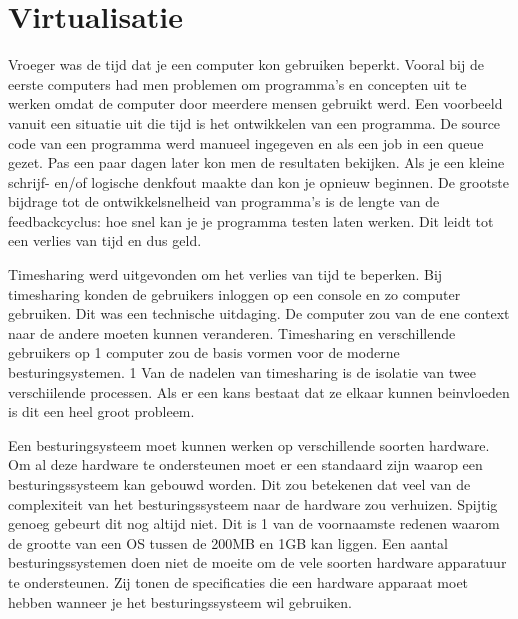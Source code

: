 \documentclass[pdftex,a4paper,12pt,twoside]{report}
\begin{document}

\chapter{Virtualisatie}
\label{ch:virtualisatie}

Vroeger was de tijd dat je een computer kon gebruiken beperkt. Vooral bij de eerste computers had men problemen om programma's en concepten uit te werken omdat de computer door meerdere mensen gebruikt werd. Een voorbeeld vanuit een situatie uit die tijd is het ontwikkelen van een programma. De source code van een programma werd manueel ingegeven en als een job in een queue gezet. Pas een paar dagen later kon men de resultaten bekijken. Als je een kleine schrijf- en/of logische denkfout maakte dan kon je opnieuw beginnen. De grootste bijdrage tot de ontwikkelsnelheid van programma's is de lengte van de feedbackcyclus: hoe snel kan je je programma testen laten werken. Dit leidt tot een verlies van tijd en dus geld.

Timesharing werd uitgevonden om het verlies van tijd te beperken. Bij timesharing konden de gebruikers inloggen op een console en zo computer gebruiken. Dit was een technische uitdaging. De computer zou van de ene context naar de andere moeten kunnen veranderen. Timesharing en verschillende gebruikers op 1 computer zou de basis vormen voor de moderne besturingsystemen. 1 Van de nadelen van timesharing is de isolatie van twee verschiilende processen. Als er een kans bestaat dat ze elkaar kunnen beinvloeden is dit een heel groot probleem.

Een besturingsysteem moet kunnen werken op verschillende soorten hardware. Om al deze hardware te ondersteunen moet er een standaard zijn waarop een besturingssysteem kan gebouwd worden. Dit zou betekenen dat veel van de complexiteit van het besturingssysteem naar de hardware zou verhuizen. Spijtig genoeg gebeurt dit nog altijd niet. Dit is 1 van de voornaamste redenen waarom de grootte van een OS tussen de 200MB en 1GB kan liggen. Een aantal besturingssystemen doen niet de moeite om de vele soorten hardware apparatuur te ondersteunen. Zij tonen de specificaties die een hardware apparaat moet hebben wanneer je het besturingssysteem wil gebruiken. \newpage
\end{document}
